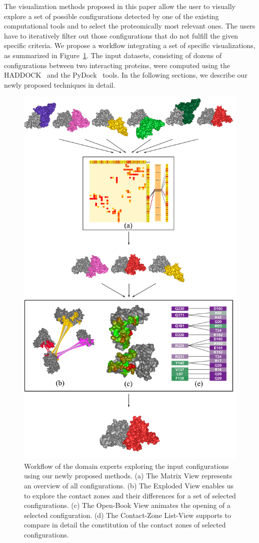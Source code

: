 \documentclass[twocolumn]{bmcart}%
\def\ExpView {Exploded View\xspace}
\def\MatView {Matrix View\xspace}
\def\CoZoListView {Contact-Zone List-View\xspace}
\begin{document}
The visualization methods proposed in this paper allow the user to visually explore a set of possible configurations detected by one of the existing computational tools and to select the proteomically most relevant ones.
The users have to iteratively filter out those configurations that do not fulfill the given specific criteria.
We propose a workflow integrating a set of specific visualizations, as summarized in Figure~\ref{fig:workflow}.
The input datasets, consisting of dozens of configurations between two interacting proteins, were computed using the HADDOCK~\cite{haddock} and the PyDock~\cite{pydock} tools.
In the following sections, we describe our newly proposed techniques in detail.

\begin{figure}[htb]
  \centering	
  \includegraphics[width=0.85\columnwidth]{images/figure3.pdf}
  \vspace{-5pt}
  \caption{Workflow of the domain experts exploring the input configurations using our newly proposed methods. (a) The \MatView represents an overview of all configurations. (b) The \ExpView enables us to explore the contact zones and their differences for a set of selected configurations. (c) The Open-Book View animates the opening of a selected configuration. (d) The \CoZoListView supports to compare in detail the constitution of the contact zones of selected configurations.}
  \label{fig:workflow}
\end{figure}
\end{document}

